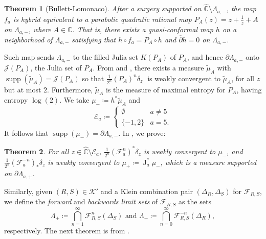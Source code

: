 \documentclass[11pt,letterpaper]{article}
\newtheorem{theorem}{Theorem}[section]
\theoremstyle{definition}
\def\supp{\operatorname{supp}}
\def\F{\mathcal{F}_a}
\def\J{\operatorname{J}_a}
\def\f{f_a}
\begin{document}
\begin{theorem}[Bullett-Lomonaco]
After a surgery supported on $\widehat{\mathbb{C}}\setminus\Lambda_{a,-}$, the map $\f$ is hybrid equivalent to a parabolic quadratic rational map $P_A(z)=z+\frac{1}{z}+A$ on $\Lambda_{a,-}$, where $A\in\mathbb{C}$. That is, there exists a quasi-conformal map $h$ on a neighborhood of $\Lambda_{a,-}$ satisfying that $h\circ\f=P_A\circ h$ and $\overline{\partial}h=0$ on $\Lambda_{a,-}$.
\end{theorem}

Such map sends $\Lambda_{a,-}$ to the filled Julia set $K(P_A)$ of $P_A$, and hence $\partial\Lambda_{a,-}$ onto $\mathcal{J}(P_A)$, the Julia set of $P_A$. From \cite{FreLopMan83} and \cite{Lju83}, there exists a measure $\tilde{\mu}_A$ with $\supp(\tilde{\mu}_A)=\mathcal{J}(P_A)$ so that $\frac{1}{2^n}(P_A)^n\delta_{z_0}$ is weakly convergent to $\tilde{\mu}_A$, for all $z$ but at most $2$. Furthermore, $\tilde{\mu}_A$ is the measure of maximal entropy for $P_A$, having entropy $\log(2)$. We take $\mu_-\coloneqq h^*\tilde{\mu}_A$ and
$$\mathcal{E}_a\coloneqq\left\lbrace\begin{matrix}\emptyset&a\neq 5\\
\lbrace -1,2\rbrace&a=5.\end{matrix}\right.$$
It follows that $\supp(\mu_-)=\partial\Lambda_{a,-}$. In \cite{Mat23}, we prove:

\begin{theorem}
For all $z\in\widehat{\mathbb{C}}\setminus\mathcal{E}_a$, $\frac{1}{2^n}(\F^n)^*\delta_z$ is weakly convergent to $\mu_-$, and $\frac{1}{2^n}(\F^{-n})_*\delta_z$ is weakly convergent to $\mu_+\coloneqq\J^*\mu_-$, which is a measure supported on $\partial\Lambda_{a,+}$.
\end{theorem}

Similarly, given $(R,S)\in\mathcal{K}'$ and a Klein combination pair $(\Delta_R,\Delta_S)$ for $\mathcal{F}_{R,S}$, we define the \emph{forward} and \emph{backwards limit sets} of $\mathcal{F}_{R,S}$ as the sets
$$\Lambda_+\coloneqq\bigcap\limits_{n=1}^{\infty}\mathcal{F}_{R,S}^n(\Delta_S)\mbox{ and }\Lambda_-\coloneqq\bigcap\limits_{n=0}^{\infty}\mathcal{F}_{R,S}^{-n}(\Delta_R),$$
respectively. The next theorem is from \cite{Bul00}.
\end{document}

